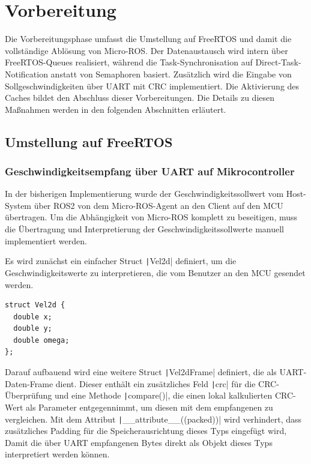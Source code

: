 \section{Vorbereitung}

Die Vorbereitungsphase umfasst die Umstellung auf FreeRTOS und damit die
vollständige Ablösung von Micro-ROS. Der Datenaustausch wird intern über
FreeRTOS-Queues realisiert, während die Task-Synchronisation auf
Direct-Task-Notification anstatt von Semaphoren basiert. Zusätzlich wird die
Eingabe von Sollgeschwindigkeiten über UART mit CRC implementiert. Die
Aktivierung des Caches bildet den Abschluss dieser Vorbereitungen. Die Details
zu diesen Maßnahmen werden in den folgenden Abschnitten erläutert.

\subsection{Umstellung auf FreeRTOS}

\subsubsection{Geschwindigkeitsempfang über UART auf Mikrocontroller}

In der bisherigen Implementierung wurde der Geschwindigkeitssollwert vom
Host-System über ROS2 von dem Micro-ROS-Agent an den Client auf den MCU
übertragen. Um die Abhängigkeit von Micro-ROS komplett zu beseitigen, muss die
Übertragung und Interpretierung der Geschwindigkeitssollwerte manuell
implementiert werden.

Es wird zunächst ein einfacher Struct \texttt|Vel2d| definiert, um die
Geschwindigkeitswerte zu interpretieren, die vom Benutzer an den MCU gesendet
werden.

\begin{code}
\begin{verbatim}
struct Vel2d {
  double x;
  double y;
  double omega;
};
\end{verbatim}
\end{code}

Darauf aufbauend wird eine weitere Struct \texttt|Vel2dFrame|
definiert, die als UART-Daten-Frame dient. Dieser enthält ein zusätzliches Feld
\texttt|crc| für die CRC-Überprüfung und eine Methode
\texttt|compare()|, die einen lokal kalkulierten CRC-Wert als Parameter
entgegennimmt, um diesen mit dem empfangenen zu vergleichen. Mit dem Attribut
\linebreak\texttt|__attribute__((packed))| wird verhindert, dass
zusätzliches Padding für die Speicherausrichtung dieses Typs eingefügt wird,
Damit die über UART empfangenen Bytes direkt als Objekt dieses Typs
interpretiert werden können.

